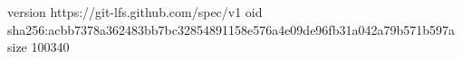 version https://git-lfs.github.com/spec/v1
oid sha256:acbb7378a362483bb7bc32854891158e576a4e09de96fb31a042a79b571b597a
size 100340
